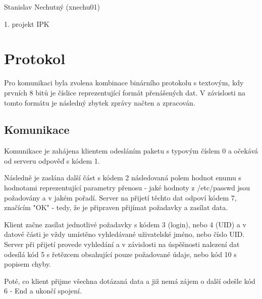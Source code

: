 \documentclass[11pt,a4paper]{article}
\author{Stanislav Nechutný}
\begin{document}
Stanislav Nechutný (xnechu01)

1. projekt IPK

\section{Protokol}
	Pro komunikaci byla zvolena kombinace binárního protokolu s textovým, kdy prvních 8 bitů je číslice reprezentující formát přenášených dat. V závislosti na tomto formátu je následný zbytek zprávy načten a zpracován.
	
	\subsection{Komunikace}
	Komunikace je zahájena klientem odesláním paketu s typovým číslem 0 a očekává od serveru odpověď s kódem 1.
	
	Následně je zaslána další část s kódem 2 následovaná polem hodnot enumu s hodnotami reprezentující parametry přenosu - jaké hodnoty z /etc/passwd jsou požadovány a v jakém pořadí. Server na přijetí těchto dat odpoví kódem 7, značícím "OK" - tedy, že je připraven přijímat požadavky a zasílat data.
	
	Klient začne zasílat jednotlivé požadavky s kódem 3 (login), nebo 4 (UID) a v datové části je vždy umístěno vyhledávané uživatelské jméno, nebo číslo UID. Server při přijetí provede vyhledání a v závislosti na úspěšnosti nalezení dat odesílá kód 5 s řetězcem obsahující pouze požadované údaje, nebo kód 10 s popisem chyby.
	
	Poté, co klient přijme všechna dotázaná data a již nemá zájem o další odešle kód 6 - End a ukončí spojení.
	
	
\end{document}
